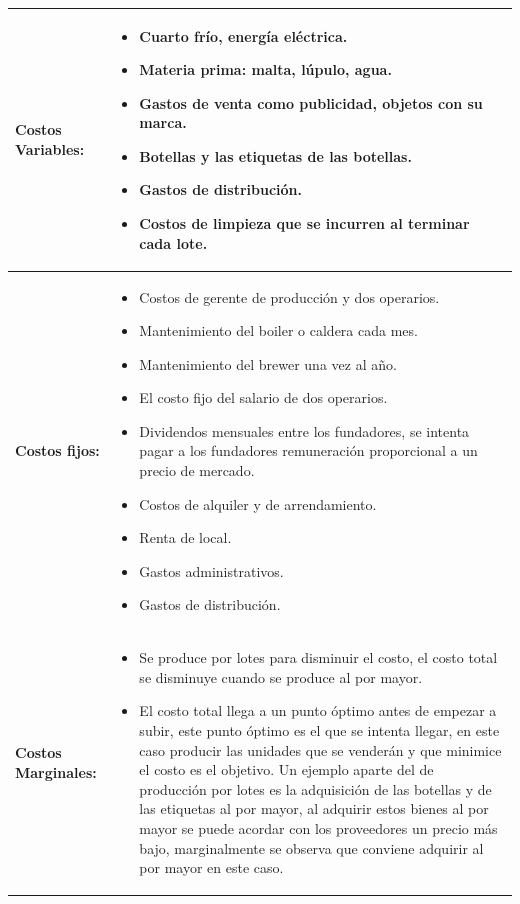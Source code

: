 \documentclass{article}
\begin{document}
\begin{center}
   \begin{longtable}{ | p{4.5cm} | p{12cm} | }
       \hline
            \textbf{Costos Variables: }  & 
            \begin{itemize}
                \item Cuarto frío, energía eléctrica.
                \item Materia prima: malta, lúpulo, agua.
                \item Gastos de venta como publicidad, objetos con su marca.
                \item Botellas y las etiquetas de las botellas.
                \item Gastos de distribución.
                \item Costos de limpieza que se incurren al terminar cada lote.
            \end{itemize} \\ 

       \hline
            \textbf{Costos fijos: } & 
            \begin{itemize}
                \item Costos de gerente de producción y dos operarios.
                \item Mantenimiento del boiler o caldera cada mes.
                \item Mantenimiento del brewer una vez al año.
                \item El costo fijo del salario de dos operarios.
                \item Dividendos mensuales entre los fundadores, se intenta pagar a los fundadores remuneración proporcional a un precio de mercado.
                \item Costos de alquiler y de arrendamiento.
                \item Renta de local.
                \item Gastos administrativos.
                \item Gastos de distribución.
            \end{itemize} \\ 
            
        \hline
            \textbf{Costos Marginales: } & 
            \begin{itemize}
                \item Se produce por lotes para disminuir el costo, el costo total se disminuye cuando se produce al por mayor.
                \item El costo total llega a un punto óptimo antes de empezar a subir, este punto óptimo es el que se intenta llegar, en este caso producir las unidades que se venderán y que minimice el costo es el objetivo. Un ejemplo aparte del de producción por lotes es la adquisición de las botellas y de las etiquetas al por mayor, al adquirir estos bienes al por mayor se puede acordar con los proveedores un precio más bajo, marginalmente se observa que conviene adquirir al por mayor en este caso.
            \end{itemize} \\ 
            

\end{longtable}
\end{center}
\end{document}
